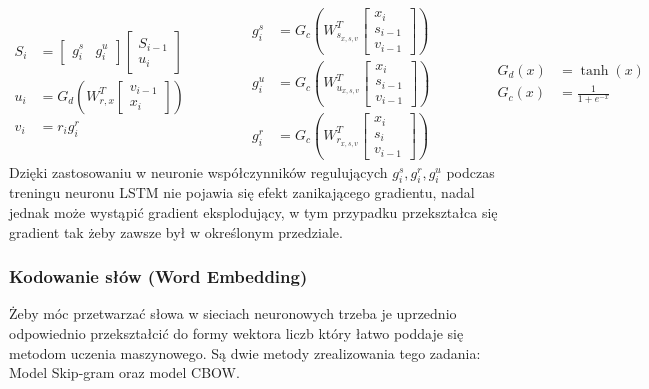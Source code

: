 \begin{equation*}
    \label{eqn:lstm-neuron}
\begin{split} 
   	S_i &= \begin{bmatrix} g^s_i & g^u_i \end{bmatrix} \begin{bmatrix} S_{i-1} \\ u_i\end{bmatrix} \\
   	u_i &= G_d(W^T_{r,x}\begin{bmatrix}v_{i-1} \\ x_i \end{bmatrix} ) \\
   	v_i &= r_ig^r_i
\end{split}
\quad\quad\quad\quad
\begin{split}
   	g^s_i &=G_c( W^T_{s_{x,s,v}} \begin{bmatrix} x_i \\ s_{i-1} \\ v_{i-1} \end{bmatrix}) \\
   	g^u_i &=  G_c(W^T_{u_{x,s,v}} \begin{bmatrix} x_i \\ s_{i-1} \\ v_{i-1} \end{bmatrix}) \\
   	g^r_i &=   G_c(W^T_{r_{x,s,v}} \begin{bmatrix} x_i \\ s_i \\ v_{i-1} \end{bmatrix})
\end{split}
\quad\quad\quad\quad
\begin{split}
   G_d(x) &= \tanh(x) \\
   G_c(x) &= \frac{1}{1+e^{-x}}
\end{split}
\end{equation*}
Dzięki zastosowaniu w neuronie współczynników  regulujących $g^s_i ,g^r_i, g^u_i$ podczas treningu neuronu LSTM nie pojawia się efekt zanikającego gradientu, nadal jednak może wystąpić gradient eksplodujący, w tym przypadku przekształca się gradient tak żeby zawsze był w określonym przedziale.\cite[p.~22,23]{LSTM-intro}

\subsubsection{Kodowanie słów (Word Embedding)}
Żeby móc przetwarzać słowa w sieciach neuronowych trzeba je uprzednio odpowiednio przekształcić do formy wektora liczb który łatwo poddaje się metodom uczenia maszynowego. Są dwie metody zrealizowania tego zadania: Model Skip-gram oraz model CBOW.
